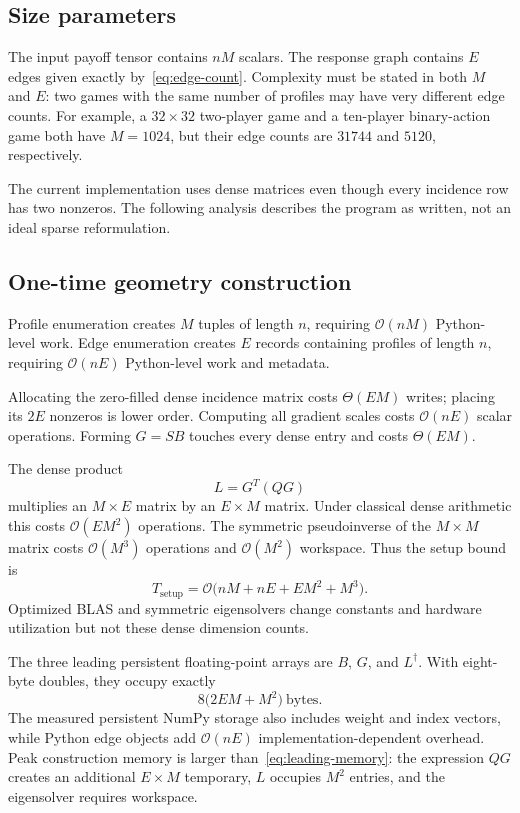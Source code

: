 \documentclass[11pt]{article}
\newcommand{\cO}{\mathcal{O}}
\begin{document}
\subsection{Size parameters}

The input payoff tensor contains $nM$ scalars.  The response graph contains
$E$ edges given exactly by~\eqref{eq:edge-count}.  Complexity must be stated in
both $M$ and $E$: two games with the same number of profiles may have very
different edge counts.  For example, a $32\times32$ two-player game and a
ten-player binary-action game both have $M=1024$, but their edge counts are
$31744$ and $5120$, respectively.

The current implementation uses dense matrices even though every incidence
row has two nonzeros.  The following analysis describes the program as
written, not an ideal sparse reformulation.

\subsection{One-time geometry construction}

Profile enumeration creates $M$ tuples of length $n$, requiring
$\cO(nM)$ Python-level work.  Edge enumeration creates $E$ records containing
profiles of length $n$, requiring $\cO(nE)$ Python-level work and metadata.

Allocating the zero-filled dense incidence matrix costs $\Theta(EM)$ writes;
placing its $2E$ nonzeros is lower order.  Computing all gradient scales costs
$\cO(nE)$ scalar operations.  Forming $G=SB$ touches every dense entry and
costs $\Theta(EM)$.

The dense product
\[
 L=G^T(QG)
\]
multiplies an $M\times E$ matrix by an $E\times M$ matrix.  Under classical
dense arithmetic this costs $\cO(EM^2)$ operations.  The symmetric
pseudoinverse of the $M\times M$ matrix costs $\cO(M^3)$ operations and
$\cO(M^2)$ workspace.  Thus the setup bound is
\begin{equation}
 T_{\mathrm{setup}}
 =\cO\bigl(nM+nE+EM^2+M^3\bigr).
 \label{eq:setup-time}
\end{equation}
Optimized BLAS and symmetric eigensolvers change constants and hardware
utilization but not these dense dimension counts.

The three leading persistent floating-point arrays are $B$, $G$, and
$L^\dagger$.  With eight-byte doubles, they occupy exactly
\begin{equation}
 8\bigl(2EM+M^2\bigr)\ \text{bytes}.
 \label{eq:leading-memory}
\end{equation}
The measured persistent NumPy storage also includes weight and index vectors,
while Python edge objects add $\cO(nE)$ implementation-dependent overhead.
Peak construction memory is larger than~\eqref{eq:leading-memory}: the
expression $QG$ creates an additional $E\times M$ temporary, $L$ occupies
$M^2$ entries, and the eigensolver requires workspace.
\end{document}
